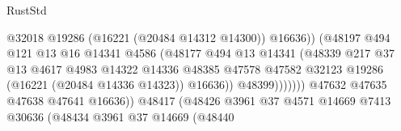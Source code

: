 \begin{lexlean}{RustStd}
\begin{coremodule}
                                                    @32018
                                                    @19286
                                                    (@16221 (@20484 @14312 @14300))
                                                    @16636))
                                                (@48197
                                                  @494
                                                  @121
                                                  @13
                                                  @16
                                                  @14341
                                                  @4586
                                                  (@48177
                                                    @494
                                                    @13
                                                    @14341
                                                    (@48339
                                                      @217
                                                      @37
                                                      @13
                                                      @4617
                                                      @4983
                                                      @14322
                                                      @14336
                                                      @48385
                                                      @47578
                                                      @47582
                                                      @32123
                                                      @19286
                                                      (@16221 (@20484 @14336 @14323))
                                                      @16636))
                                                  @48399)))))))
                                    @47632
                                    @47635
                                    @47638
                                    @47641
                                    @16636))
                                @48417
                                (@48426
                                  @3961
                                  @37
                                  @4571
                                  @14669
                                  @7413
                                  @30636
                                  (@48434
                                    @3961
                                    @37
                                    @14669
                                    (@48440

\end{coremodule}
\end{lexlean}
